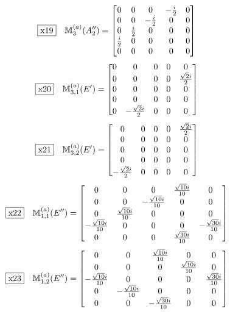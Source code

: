 \documentclass[fleqn,10pt,landscape]{jsarticle}
\begin{document}
\begin{dmath*}
\fbox{x19}\quad \mathbb{M}_{3}^{(a)}(A_{2}^{\prime\prime})=\begin{bmatrix} 0 & 0 & 0 & - \frac{i}{2} & 0 \\ 0 & 0 & - \frac{i}{2} & 0 & 0 \\ 0 & \frac{i}{2} & 0 & 0 & 0 \\ \frac{i}{2} & 0 & 0 & 0 & 0 \\ 0 & 0 & 0 & 0 & 0 \end{bmatrix}
\end{dmath*}
\begin{dmath*}
\fbox{x20}\quad \mathbb{M}_{3,1}^{(a)}(E^{\prime})=\begin{bmatrix} 0 & 0 & 0 & 0 & 0 \\ 0 & 0 & 0 & 0 & \frac{\sqrt{2} i}{2} \\ 0 & 0 & 0 & 0 & 0 \\ 0 & 0 & 0 & 0 & 0 \\ 0 & - \frac{\sqrt{2} i}{2} & 0 & 0 & 0 \end{bmatrix}
\end{dmath*}
\begin{dmath*}
\fbox{x21}\quad \mathbb{M}_{3,2}^{(a)}(E^{\prime})=\begin{bmatrix} 0 & 0 & 0 & 0 & \frac{\sqrt{2} i}{2} \\ 0 & 0 & 0 & 0 & 0 \\ 0 & 0 & 0 & 0 & 0 \\ 0 & 0 & 0 & 0 & 0 \\ - \frac{\sqrt{2} i}{2} & 0 & 0 & 0 & 0 \end{bmatrix}
\end{dmath*}
\begin{dmath*}
\fbox{x22}\quad \mathbb{M}_{1,1}^{(a)}(E^{\prime\prime})=\begin{bmatrix} 0 & 0 & 0 & \frac{\sqrt{10} i}{10} & 0 \\ 0 & 0 & - \frac{\sqrt{10} i}{10} & 0 & 0 \\ 0 & \frac{\sqrt{10} i}{10} & 0 & 0 & 0 \\ - \frac{\sqrt{10} i}{10} & 0 & 0 & 0 & - \frac{\sqrt{30} i}{10} \\ 0 & 0 & 0 & \frac{\sqrt{30} i}{10} & 0 \end{bmatrix}
\end{dmath*}
\begin{dmath*}
\fbox{x23}\quad \mathbb{M}_{1,2}^{(a)}(E^{\prime\prime})=\begin{bmatrix} 0 & 0 & \frac{\sqrt{10} i}{10} & 0 & 0 \\ 0 & 0 & 0 & \frac{\sqrt{10} i}{10} & 0 \\ - \frac{\sqrt{10} i}{10} & 0 & 0 & 0 & \frac{\sqrt{30} i}{10} \\ 0 & - \frac{\sqrt{10} i}{10} & 0 & 0 & 0 \\ 0 & 0 & - \frac{\sqrt{30} i}{10} & 0 & 0 \end{bmatrix}
\end{dmath*}
\end{document}
